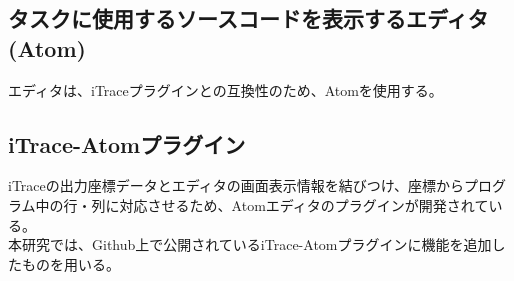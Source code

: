 \documentclass[paper=a4paper,fontsize=10pt]{jlreq}
\begin{document}
    \subsection{タスクに使用するソースコードを表示するエディタ(Atom)}
      エディタは、iTraceプラグインとの互換性のため、Atom\cite{atom}を使用する。

    \subsection{iTrace-Atomプラグイン}
      iTraceの出力座標データとエディタの画面表示情報を結びつけ、座標からプログラム中の行・列に対応させるため、Atomエディタのプラグインが開発されている。\\
      本研究では、Github上で公開されているiTrace-Atomプラグインに機能を追加したものを用いる。
    
\end{document}
